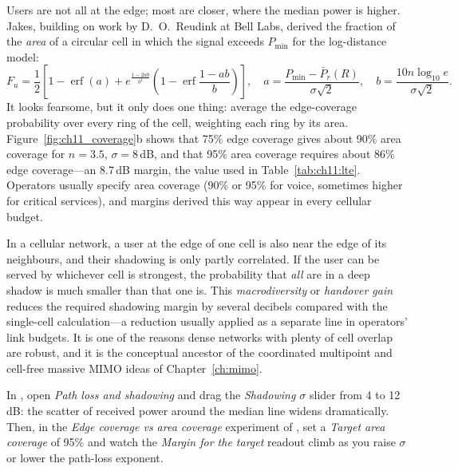 Users are not all at the edge; most are closer, where the median power is higher. Jakes, building
on work by D.~O.~Reudink at Bell Labs, derived the fraction of the \emph{area} of a circular cell in
which the signal exceeds $P_{\min}$ for the log-distance model:
\begin{equation}
F_u=\frac12\left[1-\operatorname{erf}(a)+e^{\frac{1-2ab}{b^2}}\left(1-\operatorname{erf}\frac{1-ab}{b}\right)\right],
\quad a=\frac{P_{\min}-\bar P_r(R)}{\sigma\sqrt2},\quad b=\frac{10n\log_{10}e}{\sigma\sqrt2}.
\label{eq:ch11:areacov}
\end{equation}
It looks fearsome, but it only does one thing: average the edge-coverage probability over every
ring of the cell, weighting each ring by its area. Figure~\ref{fig:ch11_coverage}b shows that 75\%
edge coverage gives about 90\% area coverage for $n=3.5$, $\sigma=8$\,dB, and that 95\% area coverage
requires about 86\% edge coverage---an 8.7\,dB margin, the value used in Table~\ref{tab:ch11:lte}.
Operators usually specify area coverage (90\% or 95\% for voice, sometimes higher for critical
services), and margins derived this way appear in every cellular budget.


\begin{inpractice}
In a cellular network, a user at the edge of one cell is also near the edge of its neighbours,
and their shadowing is only partly correlated. If the user can be served by whichever cell is
strongest, the probability that \emph{all} are in a deep shadow is much smaller than that one
is. This \emph{macrodiversity} or \emph{handover gain} reduces the required shadowing margin by
several decibels compared with the single-cell calculation---a reduction usually applied as a
separate line in operators' link budgets. It is one of the reasons dense networks with plenty of
cell overlap are robust, and it is the conceptual ancestor of the coordinated multipoint and
cell-free massive MIMO ideas of Chapter~\ref{ch:mimo}.
\end{inpractice}

\begin{tryit}
In , open \emph{Path loss and shadowing} and drag the \emph{Shadowing
$\sigma$} slider from 4 to 12\,dB: the scatter of received power around the median line widens
dramatically. Then, in the \emph{Edge coverage vs area coverage} experiment of
, set a \emph{Target area coverage} of 95\% and watch the
\emph{Margin for the target} readout climb as you raise $\sigma$ or
lower the path-loss exponent.
\end{tryit}

